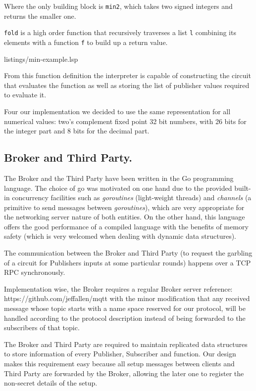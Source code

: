 Where the only \libgarble{} building block is \texttt{min2}, which takes two
signed integers and returns the smaller one.

\texttt{fold} is a high order function that recursively traverses a list
\texttt{l} combining its elements with a function \texttt{f} to build up a
return value.


{listings/min-example.lsp}

From this function definition the interpreter is capable of constructing the
circuit that evaluates the function as well as storing the list of publisher
values required to evaluate it.

Four our implementation we decided to use the same representation for all
numerical values: two's complement fixed point 32 bit numbers, with 26 bits for
the integer part and 8 bits for the decimal part.

\subsection{Broker and Third Party.}

The Broker and the Third Party have been written in the Go programming
language.  The choice of go was motivated on one hand due to the provided
built-in concurrency facilities such as \emph{goroutines} (light-weight
threads) and \emph{channels} (a primitive to send messages between
\emph{goroutines}), which are very appropriate for the networking server nature
of both entities.  On the other hand, this language offers the good performance
of a compiled language with the benefits of memory safety (which is very
welcomed when dealing with dynamic data structures).

The communication between the Broker and Third Party (to request the garbling
of a circuit for Publishers inputs at some particular rounds) happens over a
TCP RPC synchronously.

Implementation wise, the Broker requires a regular \MQTT{} Broker server
{reference: https://github.com/jeffallen/mqtt} with the minor modification that
any received message whose topic starts with a name space reserved for our
protocol, will be handled according to the protocol description instead of
being forwarded to the subscribers of that topic.

The Broker and Third Party are required to maintain replicated data structures
to store information of every Publisher, Subscriber and function.  Our design
makes this requirement easy because all setup messages between clients and
Third Party are forwarded by the Broker, allowing the later one to register the
non-secret details of the setup.

